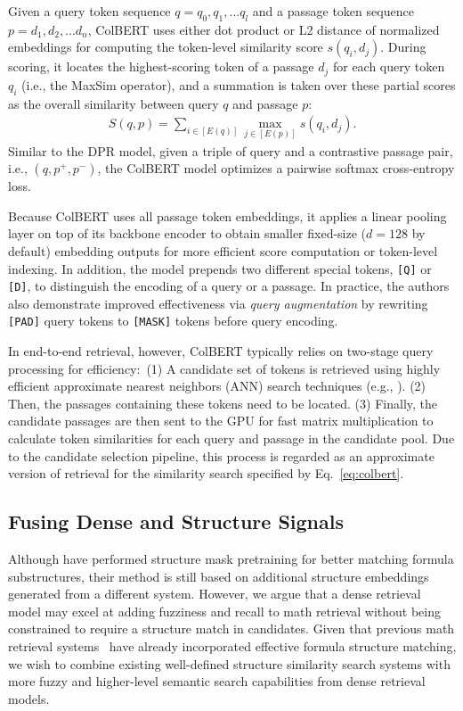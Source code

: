 \documentclass[11pt]{article}
\begin{document}
Given a query token sequence $q = q_0, q_1, ... q_l$ and a passage token sequence $p = d_1, d_2, ... d_n$, ColBERT uses either dot product or L2 distance of normalized embeddings for computing the token-level similarity score $s(q_i, d_j)$.
During scoring, it locates the highest-scoring token of a passage $d_j$ for each query token $q_i$ (i.e., the MaxSim operator), and a summation is taken over these partial scores as the overall similarity between query $q$ and passage $p$:
\begin{align}
\label{eq:colbert}
S(q, p) = \sum_{i \in [E(q)]} \max_{j \in [E(p)]} s(q_i, d_j).
\end{align}
Similar to the DPR model, given a triple of query and a contrastive passage pair, i.e., $(q, p^+, p^-)$, the ColBERT model optimizes a pairwise softmax cross-entropy loss.

Because ColBERT uses all passage token embeddings, it applies a linear pooling layer on top of its backbone encoder to obtain smaller fixed-size ($d=128$ by default) embedding outputs for more efficient score computation or token-level indexing.
In addition, the model prepends two different special tokens, \texttt{[Q]} or \texttt{[D]}, to distinguish the encoding of a query or a passage.
In practice, the authors also demonstrate improved effectiveness via \textit{query augmentation} by rewriting \texttt{[PAD]} query tokens to \texttt{[MASK]} tokens before query encoding.

In end-to-end retrieval, however, ColBERT typically relies on two-stage query processing for efficiency:\
(1) A candidate set of tokens is retrieved using highly efficient approximate nearest neighbors (ANN) search techniques (e.g., \citealp{jegou2011IVFADC_R}).
(2) Then, the passages containing these tokens need to be located.
(3) Finally, the candidate passages are then sent to the GPU for fast matrix multiplication to calculate token similarities for each query and passage in the candidate pool.
Due to the candidate selection pipeline, this process is regarded as an approximate version of retrieval for the similarity search specified by  Eq.~\ref{eq:colbert}.

\subsection{Fusing Dense and Structure Signals}

Although \citet{peng2021mathbert} have performed structure mask pretraining for better matching formula substructures, their method is still based on additional structure embeddings generated from a different system.
However, we argue that a dense retrieval model may excel at adding fuzziness and recall to math retrieval without being constrained to require a structure match in candidates.
Given that previous math retrieval systems~\cite{zhong2020accelerating,zhong2021aa} have already incorporated effective formula structure matching, we wish to combine existing well-defined structure similarity search systems with more fuzzy and higher-level semantic search capabilities from dense retrieval models.
\end{document}
